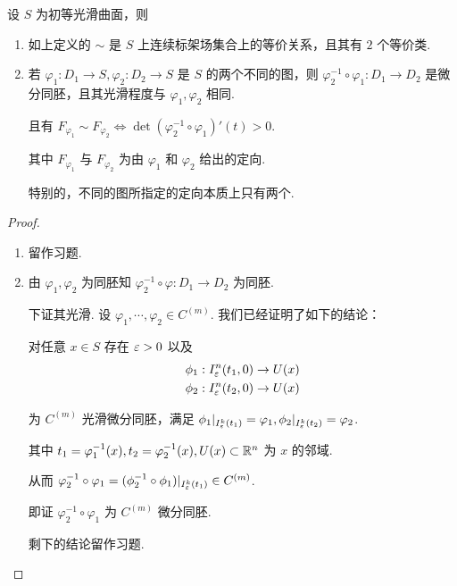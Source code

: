 \begin{property}
设 $S$ 为初等光滑曲面，则

\begin{enumerate}
    \item 如上定义的 $\sim$ 是 $S$ 上连续标架场集合上的等价关系，且其有 $2$ 个等价类.
    
    \item 若 $\varphi_1:D_1\to S,\varphi_2:D_2\to S$ 是 $S$ 的两个不同的图，则 $\varphi_2^{-1}\circ\varphi_1:D_1\to D_2$ 是微分同胚，且其光滑程度与 $\varphi_1,\varphi_2$ 相同.
    
    且有 $F_{\varphi_1}\sim F_{\varphi_2}\iff\det(\varphi_2^{-1}\circ\varphi_1)'(t)>0$.

    其中 $F_{\varphi_1}$ 与 $F_{\varphi_2}$ 为由 $\varphi_1$ 和 $\varphi_2$ 给出的定向.

    特别的，不同的图所指定的定向本质上只有两个.
\end{enumerate}
\end{property}
\begin{proof}
\begin{enumerate}
    \item 留作习题.
    
    \item 由 $\varphi_1,\varphi_2$ 为同胚知 $\varphi_2^{-1}\circ\varphi:D_1\to D_2$ 为同胚.
    
    下证其光滑. 设 $\varphi_1,\cdots,\varphi_2\in C^{(m)}$. 我们已经证明了如下的结论：

    对任意 $x\in S$ 存在 $\varepsilon>0$ 以及
$$
\begin{aligned}
\phi_1:I_\varepsilon^n(t_1,0)\to U(x)\\
\phi_2:I_\varepsilon^n(t_2,0)\to U(x)
\end{aligned}
$$

    为 $C^{(m)}$ 光滑微分同胚，满足 $\phi_1|_{I_\varepsilon^k(t_1)}=\varphi_1,\phi_2|_{I_\varepsilon^k(t_2)}=\varphi_2$.

    其中 $t_1=\varphi_1^{-1}(x),t_2=\varphi_2^{-1}(x),U(x)\subset\mathbb{R}^n$ 为 $x$ 的邻域.

    从而 $\varphi_2^{-1}\circ\varphi_1=(\phi_2^{-1}\circ\phi_1)|_{I_\varepsilon^k(t_1)}\in C^{(m)}$.

    即证 $\varphi_2^{-1}\circ\varphi_1$ 为 $C^{(m)}$ 微分同胚.
    

    剩下的结论留作习题.
\end{enumerate}
\end{proof}

